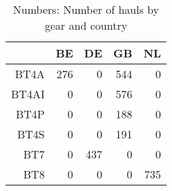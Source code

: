 \begin{table}[ht]
\centering
\begin{tabular}{rrrrr}
  \hline
 & BE & DE & GB & NL \\ 
  \hline
BT4A & 276 & 0 & 544 & 0 \\ 
  BT4AI & 0 & 0 & 576 & 0 \\ 
  BT4P & 0 & 0 & 188 & 0 \\ 
  BT4S & 0 & 0 & 191 & 0 \\ 
  BT7 & 0 & 437 & 0 & 0 \\ 
  BT8 & 0 & 0 & 0 & 735 \\ 
   \hline
\end{tabular}
\caption{Numbers: Number of hauls by gear and country} 
\end{table}
